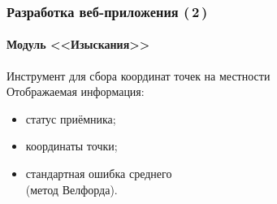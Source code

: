\documentclass[xetex,с,aspectratio=169]{beamer}
\begin{document}
%
%
{
  
  \begin{frame}
    \frametitle{Разработка веб-приложения (\,2\,)}
    \framesubtitle{Модуль <<Изыскания>>}
    \vskip 1cm
    \begin{minipage}{\textwidth}
      \flushright
      \vspace*{-3em}
      \begin{minipage}[c]{.5\textwidth}
        Инструмент для сбора координат точек на местности \\

        Отображаемая информация:
        \begin{itemize}
          \setlength\itemsep{0.5em}
          \item статус приёмника;
          \item координаты точки;
          \item стандартная ошибка среднего\\(метод Велфорда).
        \end{itemize}
      \end{minipage}
    \end{minipage}
  \end{frame}
}
\end{document}
